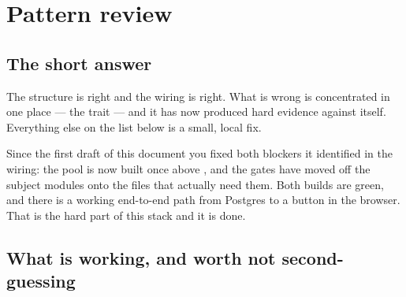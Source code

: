 \chapter{Pattern review}
\label{ch:review}

\section{The short answer}

\begin{keyidea}
The structure is right and the wiring is right. What is wrong is concentrated in one place --- the
 trait --- and it has now produced hard evidence against itself. Everything else on
the list below is a small, local fix.
\end{keyidea}

Since the first draft of this document you fixed both blockers it identified in the wiring: the pool
is now built once above , and the  gates have moved off the subject
modules onto the files that actually need them. Both builds are green, and there is a working
end-to-end path from Postgres to a button in the browser. That is the hard part of this stack and it
is done.

\section{What is working, and worth not second-guessing}

